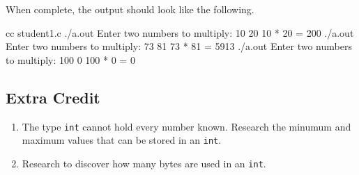 When complete, the output should look like the following.

\begin{Terminal}
cc student1.c
./a.out
Enter two numbers to multiply:  10 20
10 * 20 = 200
./a.out
Enter two numbers to multiply:  73 81
73 * 81 = 5913
./a.out
Enter two numbers to multiply:  100 0
100 * 0 = 0
\end{Terminal}


\subsection{Extra Credit}

\begin{enumerate}
\item The type \verb|int| cannot hold every number known. Research the minumum
and maximum values that can be stored in an \verb|int|.
\item Research to discover how many bytes are used in an \verb|int|.
\end{enumerate}
